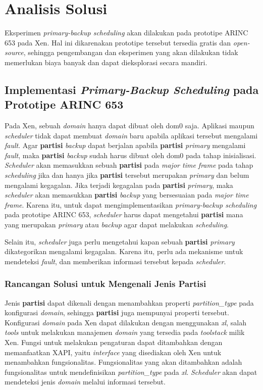 \section{Analisis Solusi}

Eksperimen \textit{primary-backup scheduling} akan dilakukan pada prototipe ARINC 653 pada Xen.
Hal ini dikarenakan prototipe tersebut tersedia gratis dan \textit{open-source}, sehingga pengembangan dan eksperimen yang akan dilakukan tidak memerlukan biaya banyak dan dapat dieksplorasi secara mandiri.

\subsection{Implementasi \textit{Primary-Backup Scheduling} pada Prototipe ARINC 653}

Pada Xen, sebuah \textit{domain} hanya dapat dibuat oleh dom0 saja.
Aplikasi maupun \textit{scheduler} tidak dapat membuat \textit{domain} baru apabila aplikasi tersebut mengalami \textit{fault}.
Agar \textbf{partisi} \textit{backup} dapat berjalan apabila \textbf{partisi} \textit{primary} mengalami \textit{fault}, maka \textbf{partisi} \textit{backup} sudah harus dibuat oleh dom0 pada tahap inisialisasi.
\textit{Scheduler} akan memasukkan sebuah \textbf{partisi} pada \textit{major time frame} pada tahap \textit{scheduling} jika dan hanya jika \textbf{partisi} tersebut merupakan \textit{primary} dan belum mengalami kegagalan.
Jika terjadi kegagalan pada \textbf{partisi} \textit{primary}, maka \textit{scheduler} akan memasukkan \textbf{partisi} \textit{backup} yang bersesuaian pada \textit{major time frame}.
Karena itu, untuk dapat mengimplementasikan \textit{primary-backup scheduling} pada prototipe ARINC 653, \textit{scheduler} harus dapat mengetahui \textbf{partisi} mana yang merupakan \textit{primary} atau \textit{backup} agar dapat melakukan \textit{scheduling}.

Selain itu, \textit{scheduler} juga perlu mengetahui kapan sebuah \textbf{partisi} \textit{primary} dikategorikan mengalami kegagalan.
Karena itu, perlu ada mekanisme untuk mendeteksi \textit{fault}, dan memberikan informasi tersebut kepada \textit{scheduler}.

\subsubsection{Rancangan Solusi untuk Mengenali Jenis \textbf{Partisi}}

Jenis \textbf{partisi} dapat dikenali dengan menambahkan properti \textit{partition\_type} pada konfigurasi \textit{domain}, sehingga \textbf{partisi} juga mempunyai properti tersebut.
Konfigurasi \textit{domain} pada Xen dapat dilakukan dengan menggunakan \textit{xl}, salah \textit{tools} untuk melakukan manajemen \textit{domain} yang tersedia pada \textit{toolstack} milik Xen.
Fungsi untuk melakukan pengaturan dapat ditambahkan dengan memanfaatkan XAPI, yaitu \textit{interface} yang disediakan oleh Xen untuk menambahkan fungsionalitas.
Fungsionalitas yang akan ditambahkan adalah fungsionalitas untuk mendefinisikan \textit{partition\_type} pada \textit{xl}.
\textit{Scheduler} akan dapat mendeteksi jenis \textit{domain} melalui informasi tersebut.

